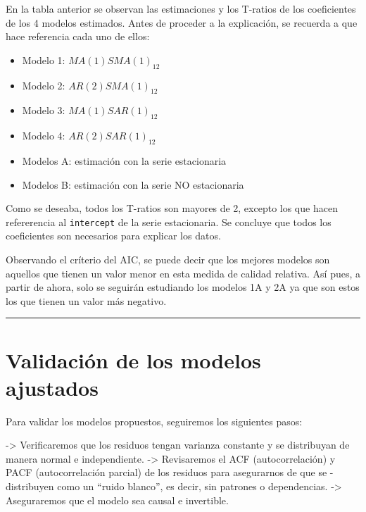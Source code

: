 \documentclass[
]{article}
\providecommand{\tightlist}{%
  \setlength{\itemsep}{0pt}\setlength{\parskip}{0pt}}
\begin{document}
\medskip

En la tabla anterior se observan las estimaciones y los T-ratios de los
coeficientes de los 4 modelos estimados. Antes de proceder a la
explicación, se recuerda a que hace referencia cada uno de ellos:

\begin{itemize}
\tightlist
\item
  Modelo 1: \(MA(1)SMA(1)_{12}\)
\item
  Modelo 2: \(AR(2)SMA(1)_{12}\)
\item
  Modelo 3: \(MA(1)SAR(1)_{12}\)
\item
  Modelo 4: \(AR(2)SAR(1)_{12}\)
\item
  Modelos A: estimación con la serie estacionaria
\item
  Modelos B: estimación con la serie NO estacionaria
\end{itemize}

Como se deseaba, todos los T-ratios son mayores de 2, excepto los que
hacen refererencia al \texttt{intercept} de la serie estacionaria. Se
concluye que todos los coeficientes son necesarios para explicar los
datos.

Observando el críterio del AIC, se puede decir que los mejores modelos
son aquellos que tienen un valor menor en esta medida de calidad
relativa. Así pues, a partir de ahora, solo se seguirán estudiando los
modelos 1A y 2A ya que son estos los que tienen un valor más negativo.

\medskip

\begin{center}\rule{0.5\linewidth}{0.5pt}\end{center}

\hypertarget{validaciuxf3n-de-los-modelos-ajustados}{%
\section{Validación de los modelos
ajustados}\label{validaciuxf3n-de-los-modelos-ajustados}}

Para validar los modelos propuestos, seguiremos los siguientes pasos:

-\textgreater{} Verificaremos que los residuos tengan varianza constante
y se distribuyan de manera normal e independiente. -\textgreater{}
Revisaremos el ACF (autocorrelación) y PACF (autocorrelación parcial) de
los residuos para asegurarnos de que se - distribuyen como un ``ruido
blanco'', es decir, sin patrones o dependencias. -\textgreater{}
Aseguraremos que el modelo sea causal e invertible.
\end{document}
